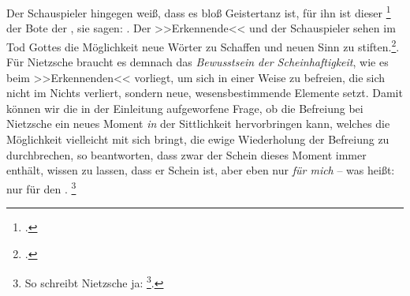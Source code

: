 \documentclass[12pt, a4paper, openany]{report}
\begin{document}
Der Schauspieler hingegen weiß, dass es bloß Geistertanz ist, für ihn ist dieser \footcite[][481]{nietzsche_morgenrote_1999} der Bote der , sie sagen: .
Der >>Erkennende<< und der Schauspieler sehen im Tod Gottes die Möglichkeit neue Wörter zu Schaffen und neuen Sinn zu stiften.\footcite[Vgl.][70]{stephan_nietzscheanismus_2019}. 
Für Nietzsche braucht es demnach das \emph{Bewusstsein der Scheinhaftigkeit}, wie es beim >>Erkennenden<< vorliegt, um sich in einer Weise zu befreien, die sich nicht im Nichts verliert, sondern neue, wesensbestimmende Elemente setzt.
Damit können wir die in der Einleitung aufgeworfene Frage, ob die Befreiung bei Nietzsche ein neues Moment \emph{in} der Sittlichkeit hervorbringen kann, welches die Möglichkeit vielleicht mit sich bringt, die ewige Wiederholung der Befreiung zu durchbrechen, so beantworten, dass zwar der Schein dieses Moment immer enthält, wissen zu lassen, dass er Schein ist, aber eben nur \emph{für mich} -- was heißt: nur für den .%
\footnote{
    So schreibt Nietzsche ja: \footcite[][S. 417. Hervorhebung von mir.]{nietzsche_morgenrote_1999}.
}
\end{document}
